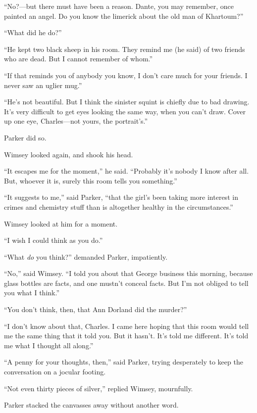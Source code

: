 \enquote{No?---but there must have been a reason. Dante, you may remember, once painted an angel. Do you know the limerick about the old man of Khartoum?}

\enquote{What did he do?}

\enquote{He kept two black sheep in his room. They remind me (he said) of two friends who are dead. But I cannot remember of whom.}

\enquote{If that reminds you of anybody you know, I don't care much for your friends. I never saw an uglier mug.}

\enquote{He's not beautiful. But I think the sinister squint is chiefly due to bad drawing. It's very difficult to get eyes looking the same way, when you can't draw. Cover up one eye, Charles\allowbreak---\allowbreak not yours, the portrait's.}

Parker did so.

Wimsey looked again, and shook his head.

\enquote{It escapes me for the moment,} he said. \enquote{Probably it's nobody I know after all. But, whoever it is, surely this room tells you something.}

\enquote{It suggests to me,} said Parker, \enquote{that the girl's been taking more interest in crimes and chemistry stuff than is altogether healthy in the circumstances.}

Wimsey looked at him for a moment.

\enquote{I wish I could think as you do.}

\enquote{What \textit{do} you think?} demanded Parker, impatiently.

\enquote{No,} said Wimsey. \enquote{I told you about that George business this morning, because glass bottles are facts, and one mustn't conceal facts. But I'm not obliged to tell you what I think.}

\enquote{You don't think, then, that Ann Dorland did the murder?}

\enquote{I don't know about that, Charles. I came here hoping that this room would tell me the same thing that it told you. But it hasn't. It's told me different. It's told me what I thought all along.}

\enquote{A penny for your thoughts, then,} said Parker, trying desperately to keep the conversation on a jocular footing.

\enquote{Not even thirty pieces of silver,} replied Wimsey, mournfully.

Parker stacked the canvasses away without another word.